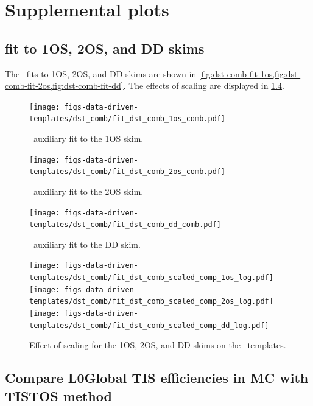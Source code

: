 \chapter{Supplemental plots}

\section{\DstComb fit to 1OS, 2OS, and DD skims}
\label{appx:suppl:dst-comb}

The \DstComb\ fits to 1OS, 2OS, and DD skims are shown in
\cref{fig:dst-comb-fit-1os,fig:dst-comb-fit-2os,fig:dst-comb-fit-dd}.
The effects of scaling are displayed in
\cref{fig:dst-comb-scale-other-skims}.

\begin{figure}[htb]
    \centering
    \texttt{[image: figs-data-driven-templates/dst\_comb/fit\_dst\_comb\_1os\_comb.pdf]}
    \caption{
        \DstComb\ auxiliary fit to the 1OS skim.
    }
    \label{fig:dst-comb-fit-1os}
\end{figure}

\begin{figure}[htb]
    \centering
    \texttt{[image: figs-data-driven-templates/dst\_comb/fit\_dst\_comb\_2os\_comb.pdf]}
    \caption{
        \DstComb\ auxiliary fit to the 2OS skim.
    }
    \label{fig:dst-comb-fit-2os}
\end{figure}

\begin{figure}[htb]
    \centering
    \texttt{[image: figs-data-driven-templates/dst\_comb/fit\_dst\_comb\_dd\_comb.pdf]}
    \caption{
        \DstComb\ auxiliary fit to the DD skim.
    }
    \label{fig:dst-comb-fit-dd}
\end{figure}

\begin{figure}[htb]
    \centering
    \texttt{[image: figs-data-driven-templates/dst\_comb/fit\_dst\_comb\_scaled\_comp\_1os\_log.pdf]}
    \texttt{[image: figs-data-driven-templates/dst\_comb/fit\_dst\_comb\_scaled\_comp\_2os\_log.pdf]}
    \texttt{[image: figs-data-driven-templates/dst\_comb/fit\_dst\_comb\_scaled\_comp\_dd\_log.pdf]}

    \caption{
        Effect of scaling for the 1OS, 2OS, and DD skims on the \DstComb\
        templates.
    }
    \label{fig:dst-comb-scale-other-skims}
\end{figure}


\section{Compare L0Global TIS efficiencies in MC with TISTOS method}
\label{appx:suppl:l0global-tis}

